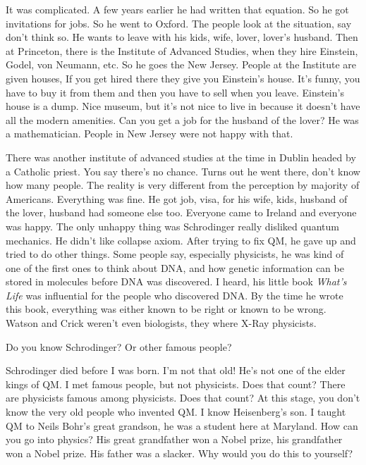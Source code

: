 It was complicated.
A few years earlier he had written that equation.
So he got invitations for jobs.
So he went to Oxford.
The people look at the situation,
say don't think so.
He wants to leave with his kids, wife, lover, lover's husband.
Then at Princeton,
there is the Institute of Advanced Studies,
when they hire Einstein, Godel, von Neumann, etc.
So he goes the New Jersey.
People at the Institute are given houses,
If you get hired there they give you Einstein's house.
It's funny,
you have to buy it from them and then you have to sell when you leave.
Einstein's house is a dump.
Nice museum, but it's not nice to live in because it doesn't have all the modern
amenities.
Can you get a job for the husband of the lover?
He was a mathematician.
People in New Jersey were not happy with that.

There was another institute of advanced studies at the time in Dublin headed by
a Catholic priest.
You say there's no chance.
Turns out he went there,
don't know how many people.
The reality is very different from the perception by majority of Americans.
Everything was fine.
He got job, visa, for his wife, kids, husband of the lover,
husband had someone else too.
Everyone came to Ireland and everyone was happy.
The only unhappy thing was Schrodinger really disliked quantum mechanics.
He didn't like collapse axiom.
After trying to fix QM,
he gave up and tried to do other things.
Some people say,
especially physicists,
he was kind of one of the first ones to think about DNA,
and how genetic information can be stored in molecules
before DNA was discovered.
I heard,
his little book \textit{What's Life}
was influential for the people who discovered DNA.
By the time he wrote this book,
everything was either known to be right or known to be wrong.
Watson and Crick weren't even biologists,
they where X-Ray physicists.

\begin{question}
    Do you know Schrodinger?
    Or other famous people?
\end{question}
Schrodinger died before I was born.
I'm not that old!
He's not one of the elder kings of QM.
I met famous people,
but not physicists.
Does that count?
There are physicists famous among physicists.
Does that count?
At this stage,
you don't know the very old people who invented QM.
I know Heisenberg's son.
I taught QM to Neils Bohr's great grandson,
he was a student here at Maryland.
How can you go into physics?
His great grandfather won a Nobel prize,
his grandfather won a Nobel prize.
His father was a slacker.
Why would you do this to yourself?

